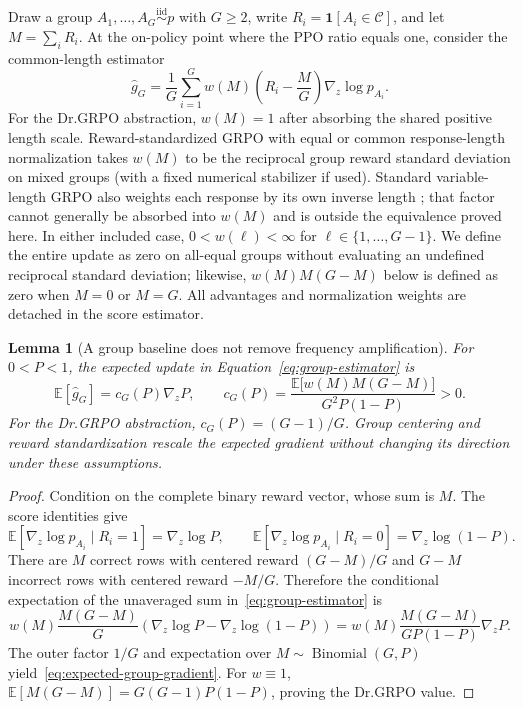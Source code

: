\documentclass{article}
\newcommand{\1}{\mathbf 1}
\newcommand{\E}{\mathbb E}
\newtheorem{lemma}{Lemma}[section]
\theoremstyle{remark}
\theoremstyle{definition}
\theoremstyle{plain}
\begin{document}
Draw a group $A_1,\ldots,A_G\stackrel{\mathrm{iid}}{\sim}p$ with $G\ge2$,
write $R_i=\1[A_i\in\mathcal C]$, and let $M=\sum_iR_i$. At the on-policy
point where the PPO ratio equals one, consider the common-length estimator
\begin{equation}
  \widehat g_G
  =\frac1G\sum_{i=1}^G
   w(M)\left(R_i-\frac{M}{G}\right)\nabla_z\log p_{A_i}.
  \label{eq:group-estimator}
\end{equation}
For the Dr.GRPO abstraction, $w(M)=1$ after absorbing the shared positive
length scale. Reward-standardized GRPO with equal or common response-length
normalization takes $w(M)$ to be the reciprocal group reward standard
deviation on mixed groups (with a fixed numerical stabilizer if used).
Standard variable-length GRPO also weights each response by its own inverse
length \citep{shao2024deepseekmath,liu2025understanding}; that factor cannot
generally be absorbed into $w(M)$ and is outside the equivalence proved here.
In either included case, $0<w(\ell)<\infty$ for
$\ell\in\{1,\ldots,G-1\}$. We define the entire update as zero on all-equal
groups without evaluating an undefined reciprocal standard deviation;
likewise, $w(M)M(G-M)$ below is defined as zero when $M=0$ or $M=G$. All
advantages and normalization weights are detached in the score estimator.

\begin{lemma}[A group baseline does not remove frequency amplification]
\label{lem:grpo-mean}
For $0<P<1$, the expected update in Equation~\eqref{eq:group-estimator} is
\begin{equation}
  \E[\widehat g_G]
  =c_G(P)\nabla_z P,
  \qquad
  c_G(P)=
  \frac{\E\!\big[w(M)M(G-M)\big]}{G^2P(1-P)}>0.
  \label{eq:expected-group-gradient}
\end{equation}
For the Dr.GRPO abstraction, $c_G(P)=(G-1)/G$. Group centering and reward
standardization rescale the expected gradient without changing its direction
under these assumptions.
\end{lemma}

\begin{proof}
Condition on the complete binary reward vector, whose sum is $M$. The score
identities give
\[
  \E[\nabla_z\log p_{A_i}\mid R_i=1]=\nabla_z\log P,
  \qquad
  \E[\nabla_z\log p_{A_i}\mid R_i=0]
  =\nabla_z\log(1-P).
\]
There are $M$ correct rows with centered reward $(G-M)/G$ and $G-M$
incorrect rows with centered reward $-M/G$. Therefore the conditional
expectation of the unaveraged sum in~\eqref{eq:group-estimator} is
\[
  w(M)\frac{M(G-M)}{G}
  \left(\nabla_z\log P-\nabla_z\log(1-P)\right)
  =w(M)\frac{M(G-M)}{GP(1-P)}\nabla_zP.
\]
The outer factor $1/G$ and expectation over
$M\sim\operatorname{Binomial}(G,P)$ yield~\eqref{eq:expected-group-gradient}.
For $w\equiv1$,
$\E[M(G-M)]=G(G-1)P(1-P)$, proving the Dr.GRPO value.
\end{proof}
\end{document}
